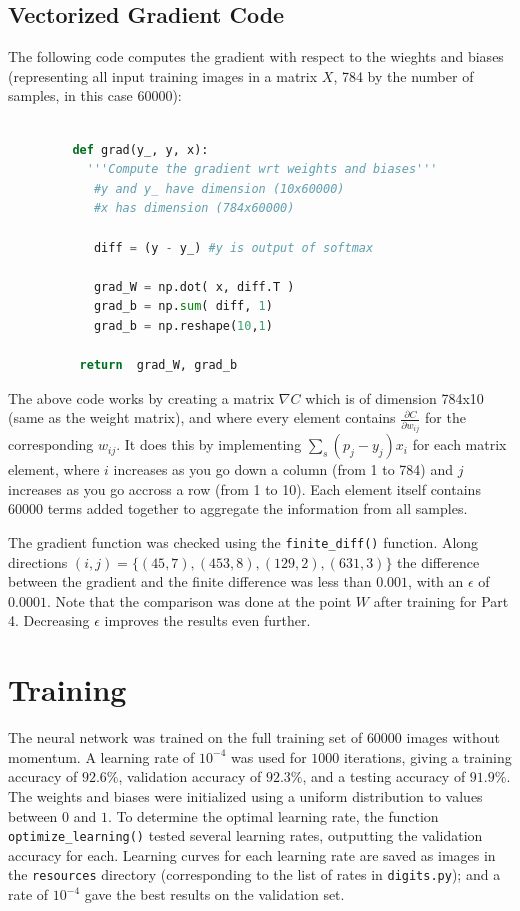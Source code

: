 \documentclass{article}
\begin{document}
   \subsection{Vectorized Gradient Code}
   The following code computes the gradient with respect to the wieghts and biases
   (representing all input training images in a matrix $X$, 784 by the number of samples, in this case 60000):
      \begin{lstlisting}[language=Python]

         def grad(y_, y, x):
      	   '''Compute the gradient wrt weights and biases'''
          	#y and y_ have dimension (10x60000)
          	#x has dimension (784x60000)

          	diff = (y - y_) #y is output of softmax

          	grad_W = np.dot( x, diff.T )
          	grad_b = np.sum( diff, 1)
          	grad_b = np.reshape(10,1)

          return  grad_W, grad_b
      \end{lstlisting}

   The above code works by creating a matrix $\nabla C $ which is of dimension 784x10
   (same as the weight matrix), and where every element contains $\frac{ \partial C}{ \partial w_{ij} }$ for the corresponding $w_{ij}$.
   It does this by implementing $\sum_s ( p_j - y_j ) x_i$ for each matrix element, where $i$ increases as you go down
   a column (from 1 to 784) and $j$ increases as you go accross a row (from 1 to 10). Each element itself contains 60000
   terms added together to aggregate the information from all samples.

   The gradient function was checked using the \texttt{finite\_diff()} function. Along directions
   $(i, j) = \{ (45,7), (453,8), (129,2), (631,3)  \}$ the difference between the gradient and the finite difference was less than $0.001$,
   with an $\epsilon$ of $0.0001$. Note that the comparison was done at the point $W$ after training for
   Part 4. Decreasing $\epsilon$ improves the results even further.

   \section{Training}
   The neural network was trained on the full training set of $60000$ images without momentum.
   A learning rate of $10^{-4}$ was used for $1000$ iterations, giving a training accuracy of $92.6\%$,
   validation accuracy of $92.3\%$, and a testing accuracy of $91.9\%$.
   The weights and biases were initialized using a uniform distribution to values between $0$ and $1$.
   To determine the optimal learning rate, the function \texttt{optimize\_learning()} tested several
   learning rates, outputting the validation accuracy for each. Learning curves for each learning rate
   are saved as images in the \texttt{resources} directory (corresponding to the list of
   rates in \texttt{digits.py}); and a rate of $10^{-4}$ gave the best
   results on the validation set.
\end{document}
